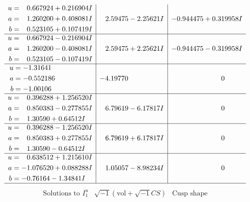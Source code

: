 \documentclass[1p]{elsarticle_modified}
\theoremstyle{definition}
\newcommand{\I}{\sqrt{-1}}
\begin{document}
$$\begin{array}{c|c|c}
\begin{aligned}
u &= \phantom{-}0.667924 + 0.216904 I \\
a &= \phantom{-}1.260200 + 0.408081 I \\
b &= \phantom{-}0.523105 + 0.107419 I\end{aligned}
 & \phantom{-}2.59475 - 2.25621 I & -0.944475 + 0.319958 I \\ \hline\begin{aligned}
u &= \phantom{-}0.667924 - 0.216904 I \\
a &= \phantom{-}1.260200 - 0.408081 I \\
b &= \phantom{-}0.523105 - 0.107419 I\end{aligned}
 & \phantom{-}2.59475 + 2.25621 I & -0.944475 - 0.319958 I \\ \hline\begin{aligned}
u &= -1.31641\phantom{ +0.000000I} \\
a &= -0.552186\phantom{ +0.000000I} \\
b &= -1.00106\phantom{ +0.000000I}\end{aligned}
 & -4.19770\phantom{ +0.000000I} & \phantom{-0.000000 } 0 \\ \hline\begin{aligned}
u &= \phantom{-}0.396288 + 1.256520 I \\
a &= \phantom{-}0.850383 - 0.277855 I \\
b &= \phantom{-}1.30590 + 0.64512 I\end{aligned}
 & \phantom{-}6.79619 - 6.17817 I & \phantom{-0.000000 } 0 \\ \hline\begin{aligned}
u &= \phantom{-}0.396288 - 1.256520 I \\
a &= \phantom{-}0.850383 + 0.277855 I \\
b &= \phantom{-}1.30590 - 0.64512 I\end{aligned}
 & \phantom{-}6.79619 + 6.17817 I & \phantom{-0.000000 } 0 \\ \hline\begin{aligned}
u &= \phantom{-}0.638512 + 1.215610 I \\
a &= -1.076520 + 0.088288 I \\
b &= -0.76164 - 1.34841 I\end{aligned}
 & \phantom{-}1.05057 - 8.98234 I & \phantom{-0.000000 } 0\\
 \hline 
 \end{array}$$\newpage$$\begin{array}{c|c|c}  
\text{Solutions to }I^u_{1}& \I (\text{vol} + \sqrt{-1}CS) & \text{Cusp shape}\\

\end{array}$$
\end{document}
